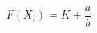 \documentclass[UTF8]{ctexart}
\newenvironment{text}{}{}
\begin{document}
\normalsize
\begin{text}


\end{text}
\begin{equation}
F(X_i)=K+\frac{a}{b}
\end{equation}
\begin{text}




\end{text}
\end{document}

